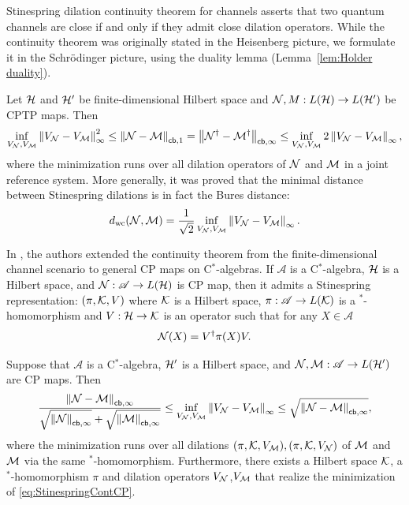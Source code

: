 \documentclass[10pt]{article}
\newcommand{\norm}[1]{\left\|#1\right\|}
\newcommand{\s}[1]{\mathsf{#1}}
\begin{document}
 Stinespring dilation continuity theorem for channels \cite[Theorem~1]{Kretschmann2008Information} asserts that two quantum channels are close if and only if they admit close dilation operators. While the continuity theorem was originally stated in the Heisenberg picture, we formulate it in the Schr\"{o}dinger picture, using the duality lemma (Lemma~\ref{lem:Holder duality}).
 \begin{theorem}\label{th:SteinContChannels}
     Let ${\cal H}$ and ${\cal H}'$ be finite-dimensional Hilbert space and   ${\cal N},M:L({\cal H})\to L({\cal H}')$ be  CPTP maps. Then
     \[\inf_{V_{\calN},V_{\calM}}\norm{V_{\calN}-V_{\calM}}_\infty^2\leq \norm{\calN -\calM}_{\s{cb},1}=\norm{\calN^\dag -\calM^\dag}_{\s{cb},\infty}\leq \inf_{V_{\calN},V_{\calM}}2 \norm{V_{\calN}-V_{\calM}}_\infty, \]
     where the minimization runs over all dilation operators of ${\cal N}$ and ${\cal M}$ in a joint reference system.  
     More generally, it was proved that the minimal distance between Stinespring dilations is in fact the Bures distance:
     \begin{equation}
        d_{\mathrm{wc}}(\calN,\calM)= \frac{1}{\sqrt{2} }\inf_{V_{\calN},V_{\calM}}\norm{V_{\calN}-V_{\calM}}_\infty.\label{eq:BuresDistanceStinespring}
     \end{equation}
 \end{theorem}
 
In \cite{Kretschmann2008Continuity}, the authors extended the continuity theorem from the finite-dimensional channel scenario to general CP maps on C$^*$-algebras. If $\mathscr{A}$ is a C$^*$-algebra, ${\cal H}$ is a Hilbert space, and ${\cal N}:\mathscr{A}\to  L({\cal H})$ is CP map, then it admits a Stinespring representation: $(\pi,{\cal K}, V)$  where ${\cal K}$ is a Hilbert space, $\pi:\mathscr{A}\to L({\cal K})$ is a $^*$-homomorphism and $V:{\cal H}\to {\cal K}$ is an operator such that for any $X\in \mathscr{A}$
\[{\cal N}(X)=V^{\dag}\pi(X)V.\]
 \begin{theorem}\label{th:SteinContCP}
    Suppose that $\mathscr{A}$ is a C$^*$-algebra, ${\cal H}'$ is a Hilbert space, and ${\cal N},{\cal M}:\mathscr{A}\to  L({\cal H}')$ are CP maps. Then
     \begin{equation}
         \frac{\norm{\calN -\calM}_{\s{cb},\infty}}{\sqrt{\norm{\calN}_{\s{cb},\infty}}+\sqrt{\norm{\calM}_{\s{cb},\infty}}} \leq \inf_{V_{\calN},V_{\calM}}\norm{V_{\calN}-V_{\calM}}_\infty\leq \sqrt{\norm{\calN -\calM}_{\s{cb},\infty}},\label{eq:StinespringContCP}
     \end{equation}
     where the minimization runs over all dilations $(\pi,{\cal K},V_{{\cal M}}),(\pi,{\cal K},V_{{\cal N}})$  of ${\cal M}$ and ${\cal M}$ via the same $^*$-homomorphism. Furthermore, there exists a Hilbert space ${\cal K}$, a $^*$-homomorphism $\pi$ and dilation operators $V_{{\cal N}}$,$V_{{\cal M}}$ that realize the minimization of \eqref{eq:StinespringContCP}.
 \end{theorem}
\end{document}
